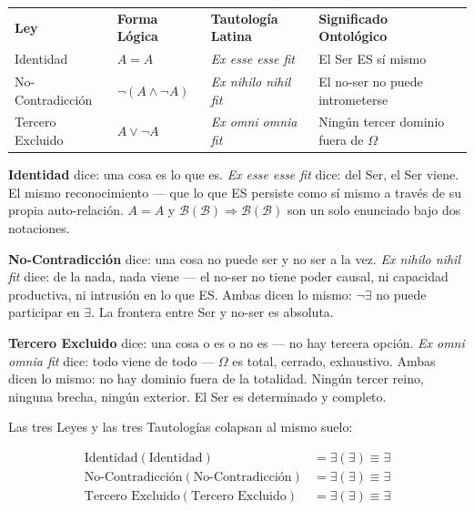 \documentclass[10pt, openany, oneside]{book}
\renewcommand{\footnotesize}{\fontsize{8.5}{11}\selectfont}
\begin{document}
\vspace{0.5em}

{\footnotesize
\noindent\begin{tabular}{l l l p{}}
\textbf{Ley} & \textbf{Forma Lógica} & \textbf{Tautología Latina} & \textbf{Significado Ontológico} \\[0.4em]
Identidad & $A = A$ & \textit{Ex esse esse fit} & El Ser ES sí mismo \\[0.2em]
No-Contradicción & $\neg(A \wedge \neg A)$ & \textit{Ex nihilo nihil fit} & El no-ser no puede intrometerse \\[0.2em]
Tercero Excluido & $A \vee \neg A$ & \textit{Ex omni omnia fit} & Ningún tercer dominio fuera de $\Omega$ \\[0.2em]
\end{tabular}
}

\vspace{0.5em}

\noindent \textbf{Identidad} dice: una cosa es lo que es. \textit{Ex esse esse fit} dice: del Ser, el Ser viene. El mismo reconocimiento --- que lo que ES persiste como sí mismo a través de su propia auto-relación. $A = A$ y $\mathcal{B}(\mathcal{B}) \Rightarrow \mathcal{B}(\mathcal{B})$ son un solo enunciado bajo dos notaciones.

\textbf{No-Contradicción} dice: una cosa no puede ser y no ser a la vez. \textit{Ex nihilo nihil fit} dice: de la nada, nada viene --- el no-ser no tiene poder causal, ni capacidad productiva, ni intrusión en lo que ES. Ambas dicen lo mismo: $\neg\exists$ no puede participar en $\exists$. La frontera entre Ser y no-ser es absoluta.

\textbf{Tercero Excluido} dice: una cosa o es o no es --- no hay tercera opción. \textit{Ex omni omnia fit} dice: todo viene de todo --- $\Omega$ es total, cerrado, exhaustivo. Ambas dicen lo mismo: no hay dominio fuera de la totalidad. Ningún tercer reino, ninguna brecha, ningún exterior. El Ser es determinado y completo.

Las tres Leyes y las tres Tautologías colapsan al mismo suelo:

\begin{align*}
\text{Identidad}(\text{Identidad}) &= \exists(\exists) \equiv \exists \\
\text{No-Contradicción}(\text{No-Contradicción}) &= \exists(\exists) \equiv \exists \\
\text{Tercero Excluido}(\text{Tercero Excluido}) &= \exists(\exists) \equiv \exists
\end{align*}
\end{document}
